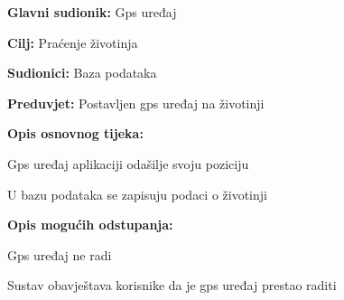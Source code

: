 					
					
					\noindent {}
					\begin{packed_item}
						
						\item \textbf{Glavni sudionik: }Gps uređaj
						\item  \textbf{Cilj:} Praćenje životinja
						\item  \textbf{Sudionici:} Baza podataka
						\item  \textbf{Preduvjet:} Postavljen gps uređaj na životinji
						\item  \textbf{Opis osnovnog tijeka:}
						
						\item[] \begin{packed_enum}
							
							\item Gps uređaj aplikaciji odašilje svoju poziciju
							\item U bazu podataka se zapisuju podaci o životinji
							
						\end{packed_enum}
						
						\item  \textbf{Opis mogućih odstupanja:}
						
						\item[] \begin{packed_item}
							
							\item[1.a] Gps uređaj ne radi
							\item[] \begin{packed_enum}
								
								\item Sustav obavještava korisnike da je gps uređaj prestao raditi
								
							\end{packed_enum}
							
						\end{packed_item}
						
					\end{packed_item}
					
